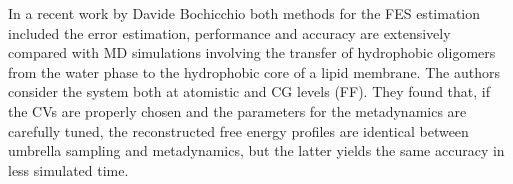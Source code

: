 In a recent work by Davide Bochicchio \etal \cite{metaUSComparison} both methods for the \ac{FES} estimation
included the error estimation, performance and accuracy are extensively compared with \ac{MD} simulations
involving the transfer of hydrophobic oligomers from the water phase to the hydrophobic core of a lipid membrane.
The authors consider the system both at atomistic and \ac{CG} levels (\martini \ac{FF}). They found that, if the
\acp{CV} are properly chosen and the parameters for the metadynamics are carefully tuned, the reconstructed free
energy profiles are identical between umbrella sampling and metadynamics, but the latter yields the same accuracy
in less simulated time.
